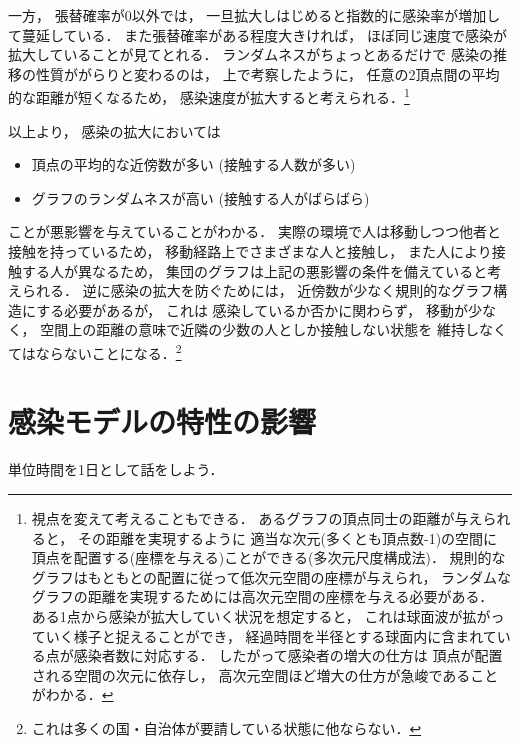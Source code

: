 \documentclass[10pt,oneside]{scrartcl}
\begin{document}
一方，
張替確率が0以外では，
一旦拡大しはじめると指数的に感染率が増加して蔓延している．
また張替確率がある程度大きければ，
ほぼ同じ速度で感染が拡大していることが見てとれる．
ランダムネスがちょっとあるだけで
感染の推移の性質ががらりと変わるのは，
上で考察したように，
任意の2頂点間の平均的な距離が短くなるため，
感染速度が拡大すると考えられる．\footnote{視点を変えて考えることもできる．
あるグラフの頂点同士の距離が与えられると，
その距離を実現するように
適当な次元(多くとも頂点数-1)の空間に
頂点を配置する(座標を与える)ことができる(多次元尺度構成法)．
規則的なグラフはもともとの配置に従って低次元空間の座標が与えられ，
ランダムなグラフの距離を実現するためには高次元空間の座標を与える必要がある．
ある1点から感染が拡大していく状況を想定すると，
これは球面波が拡がっていく様子と捉えることができ，
経過時間を半径とする球面内に含まれている点が感染者数に対応する．
したがって感染者の増大の仕方は
頂点が配置される空間の次元に依存し，
高次元空間ほど増大の仕方が急峻であることがわかる．}

\begin{figure*}%
  \centering
\end{figure*}

以上より，
感染の拡大においては
\begin{itemize}
\item 頂点の平均的な近傍数が多い (接触する人数が多い)
\item グラフのランダムネスが高い (接触する人がばらばら)
\end{itemize}
ことが悪影響を与えていることがわかる．
実際の環境で人は移動しつつ他者と接触を持っているため，
移動経路上でさまざまな人と接触し，
また人により接触する人が異なるため，
集団のグラフは上記の悪影響の条件を備えていると考えられる．
逆に感染の拡大を防ぐためには，
近傍数が少なく規則的なグラフ構造にする必要があるが，
これは
感染しているか否かに関わらず，
移動が少なく，
空間上の距離の意味で近隣の少数の人としか接触しない状態を
維持しなくてはならないことになる．\footnote{これは多くの国・自治体が要請している状態に他ならない．}

\section{感染モデルの特性の影響}
\label{sec:org9807eb4}

単位時間を1日として話をしよう．
\end{document}
